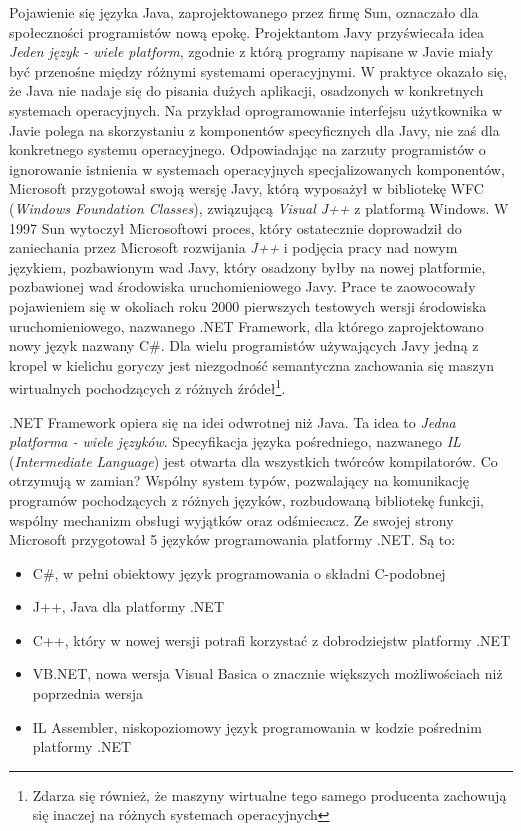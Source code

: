 Pojawienie się języka Java, zaprojektowanego przez firmę Sun, oznaczało dla społeczności programistów
nową epokę. Projektantom Javy przyświecała idea {\em Jeden język - wiele platform}, zgodnie z którą
programy napisane w Javie miały być przenośne między różnymi systemami operacyjnymi. 
W praktyce okazało się, że Java nie nadaje się do pisania dużych aplikacji, osadzonych w konkretnych
systemach operacyjnych. Na przykład oprogramowanie interfejsu użytkownika w Javie polega na skorzystaniu
z komponentów specyficznych dla Javy, nie zaś dla konkretnego systemu operacyjnego. 
Odpowiadając na zarzuty programistów o 
ignorowanie istnienia w systemach operacyjnych specjalizowanych komponentów, Microsoft
przygotował swoją wersję Javy, którą wyposażył w bibliotekę WFC ({\em Windows Foundation Classes}), związującą
{\em Visual J++} z platformą Windows. W 1997 Sun wytoczył Microsoftowi proces, który ostatecznie doprowadził
do zaniechania przez Microsoft rozwijania {\em J++} i podjęcia pracy nad nowym językiem, pozbawionym wad Javy,
który osadzony byłby na nowej platformie, pozbawionej wad środowiska uruchomieniowego Javy. Prace te
zaowocowały pojawieniem się w okoliach roku 2000 pierwszych testowych wersji środowiska uruchomieniowego, 
nazwanego .NET Framework, dla którego zaprojektowano nowy język nazwany C\#. Dla wielu programistów 
używających Javy jedną z kropel w kielichu goryczy jest niezgodność semantyczna zachowania się 
maszyn wirtualnych pochodzących z różnych źródeł\footnote{Zdarza się również, że maszyny wirtualne
tego samego producenta zachowują się inaczej na różnych systemach operacyjnych}.

.NET Framework opiera się na idei odwrotnej niż Java. Ta idea to {\em Jedna platforma - wiele języków}.
Specyfikacja języka pośredniego, nazwanego {\em IL} ({\em Intermediate Language}) 
jest otwarta dla wszystkich twórców kompilatorów. Co otrzymują w zamian? Wspólny system typów, pozwalający
na komunikację programów pochodzących z różnych języków, rozbudowaną bibliotekę funkcji, wspólny mechanizm
obsługi wyjątków oraz odśmiecacz. Ze swojej strony Microsoft przygotował 5 języków programowania platformy .NET.
Są to:
\begin{itemize}
	\item C\#, w pełni obiektowy język programowania o składni C-podobnej
	\item J++, Java dla platformy .NET
	\item C++, który w nowej wersji potrafi korzystać z dobrodziejstw platformy .NET
	\item VB.NET, nowa wersja Visual Basica o znacznie większych możliwościach niż poprzednia wersja
	\item IL Assembler, niskopoziomowy język programowania w kodzie pośrednim platformy .NET
\end{itemize}

